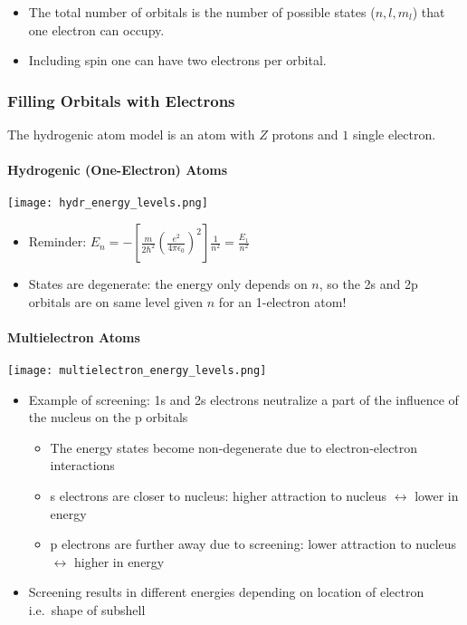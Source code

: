 
\begin{itemize}
    \item The total number of orbitals is the number of possible states ($n,l,m_l$) that one electron can occupy.
    \item Including spin one can have two electrons per orbital.
\end{itemize}

\subsubsection{Filling Orbitals with Electrons}
The hydrogenic atom model is an atom with $Z$ protons and $1$ single electron.
\paragraph{Hydrogenic (One-Electron) Atoms}


\begin{center}
    \texttt{[image: hydr\_energy\_levels.png]}
\end{center}
\begin{itemize}
    \item Reminder: $E_n = -\left[\frac{m}{2\hbar^2}{\left(\frac{e^2}{4\pi\epsilon_0}\right)}^2\right]\frac{1}{n^2} = \frac{E_1}{n^2}$
    \item States are degenerate: the energy only depends on $n$, so the 2s and 2p orbitals are on same level given $n$ for an 1-electron atom!
\end{itemize}

\paragraph{Multielectron Atoms}


\begin{center}
    \texttt{[image: multielectron\_energy\_levels.png]}
\end{center}
\begin{itemize}
    \item Example of screening: 1s and 2s electrons neutralize a part of the influence of the nucleus on the p orbitals
          \begin{itemize}
              \item The energy states become non-degenerate due to electron-electron interactions
              \item s electrons are closer to nucleus: higher attraction to nucleus $\leftrightarrow$ lower in energy
              \item p electrons are further away due to screening: lower attraction to nucleus $\leftrightarrow$ higher in energy
          \end{itemize}
    \item Screening results in different energies depending on location of electron i.e.\ shape of subshell
\end{itemize}

